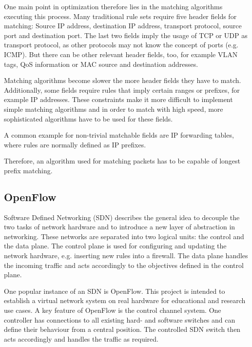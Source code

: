 \documentclass[a4paper,
		12pt,
		parskip=full,
		titlepage
		]{scrartcl}
\begin{document}
One main point in optimization therefore lies in the matching algorithms executing this process. %
Many traditional rule sets require five header fields for matching: Source IP address, destination IP address, transport protocol, source port and destination port.
The last two fields imply the usage of TCP or UDP as transport protocol, as other protocols may not know the concept of ports (e.g. ICMP). %
But there can be other relevant header fields, too, for example VLAN tags, QoS information or MAC source and destination addresses.%

Matching algorithms become slower the more header fields they have to match.
Additionally, some fields require rules that imply certain ranges or prefixes, for example IP addresses.
These constraints make it more difficult to implement simple matching algorithms and in order to match with high speed, more sophisticated
algorithms have to be used for these fields.

A common example for non-trivial matchable fields are IP forwarding tables, where rules are normally defined as IP prefixes.


Therefore, an algorithm used for matching packets has to be capable of longest prefix matching.


\subsection{OpenFlow}
Software Defined Networking (SDN) describes the general idea to decouple the two tasks of network hardware and to introduce a new layer of abstraction in networking. %
These networks are separated into two logical units: the control and the data plane.
The control plane is used for configuring and updating the network hardware, e.g. inserting new rules into a firewall.
The data plane handles the incoming traffic and acts accordingly to the objectives defined in the control plane.

One popular instance of an SDN is OpenFlow.
This project is intended to establish a virtual network system on real hardware for educational and research use cases.
A key feature of OpenFlow is the control channel system.
One controller has connections to all existing hard- and software switches and can define their behaviour from a central position.
The controlled SDN switch then acts accordingly and handles the traffic as required.
\end{document}

